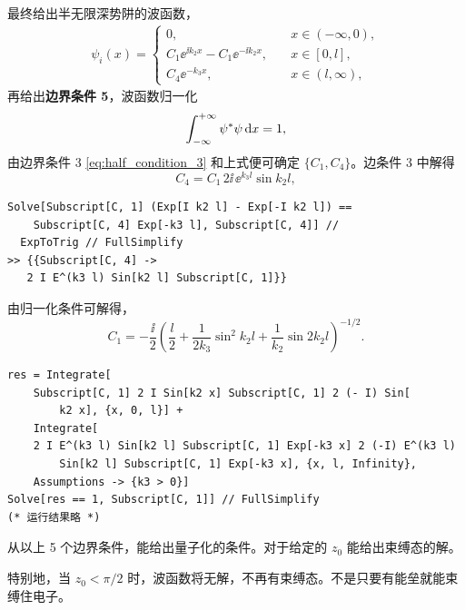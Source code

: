 最终给出半无限深势阱的波函数，
\begin{align}
    \psi_i (x) = 
    \begin{cases}
        0, \quad &x\in (-\infty, 0), \\
        C_1 \ee^{\ii k_2 x} - C_1 \ee^{-\ii k_2 x}, \quad &x\in[0,l],\\
        C_4 \ee^{-k_3 x}, \quad & x\in(l, \infty),
    \end{cases}
\end{align}
再给出\textbf{边界条件 5}，波函数归一化
\begin{eqnarray}
    \int_{- \infty}^{+ \infty} \psi^* \psi \, \mathrm{d} x = 1,
\end{eqnarray}
由边界条件 3 \eqref{eq:half_condition_3} 和上式便可确定 $\{C_1, C_4\}$。边条件 3 中解得
\begin{equation}
    C_4 = C_1 \, 2\ii \,\ee^{k_3 l} \sin k_2 l,
\end{equation}
\begin{lstlisting}
Solve[Subscript[C, 1] (Exp[I k2 l] - Exp[-I k2 l]) == 
    Subscript[C, 4] Exp[-k3 l], Subscript[C, 4]] // 
  ExpToTrig // FullSimplify
>> {{Subscript[C, 4] -> 
   2 I E^(k3 l) Sin[k2 l] Subscript[C, 1]}}
\end{lstlisting}
由归一化条件可解得，
\begin{equation}
    C_1 = -\frac{\ii}2\left(
        \frac l2 + \frac1{2 k_3} \sin^2 k_2 l + \frac1{k_2} \sin 2k_2 l
    \right)^{-1/2}. 
\end{equation}
\begin{lstlisting}
res = Integrate[
    Subscript[C, 1] 2 I Sin[k2 x] Subscript[C, 1] 2 (- I) Sin[
        k2 x], {x, 0, l}] + 
    Integrate[
    2 I E^(k3 l) Sin[k2 l] Subscript[C, 1] Exp[-k3 x] 2 (-I) E^(k3 l)
        Sin[k2 l] Subscript[C, 1] Exp[-k3 x], {x, l, Infinity}, 
    Assumptions -> {k3 > 0}]
Solve[res == 1, Subscript[C, 1]] // FullSimplify
(* 运行结果略 *)
\end{lstlisting}

从以上 5 个边界条件，能给出量子化的条件。对于给定的 $z_0$ 能给出束缚态的解。

特别地，当 $z_0 < \pi/2$ 时，波函数将无解，不再有束缚态。不是只要有能垒就能束缚住电子。


